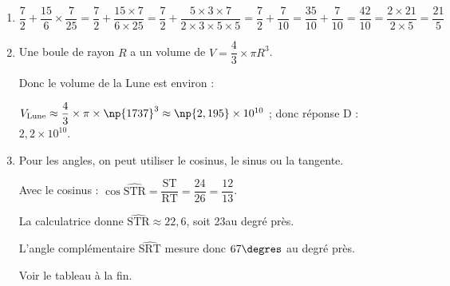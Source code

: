\begin{enumerate}
\item %

$\dfrac{7}{2} + \dfrac{15}{6} \times \dfrac{7}{25} = \dfrac{7}{2} + \dfrac{15\times 7 }{6\times25} = 
 \dfrac{7}{2} + \dfrac{5 \times 3 \times 7 }{2 \times 3 \times 5\times 5} =  \dfrac{7}{2} + \dfrac{7}{10} = \dfrac{35}{10} + \dfrac{7}{10} = \dfrac{42}{10} = \dfrac{2 \times 21}{2 \times 5} = \dfrac{21}{5}$
		
		\item %
		
Une boule de rayon $R$ a un volume de $V = \dfrac{4}{3}\times \pi R^3$.

Donc le volume de la Lune est environ :

$V_{\text{Lune}} \approx \dfrac{4}{3}\times \pi \times \np{1737}^3 \approx \np{2,195} \times 10^{10}$ ; donc réponse D : $2,2 \times 10^{10}$.	
		
		\item %
Pour les angles, on peut utiliser le cosinus, le sinus ou la tangente.

Avec le cosinus : $\cos \widehat{\text{STR}} = \dfrac{\text{ST}}{\text{RT}} = \dfrac{24}{26} = \dfrac{12}{13}$.

La calculatrice donne $\widehat{\text{STR}} \approx 22,6$, soit 23\degres au degré près.

L'angle complémentaire $\widehat{\text{SRT}}$ mesure donc $67\degres$ au degré près.

Voir le tableau à la fin.
	\end{enumerate}

